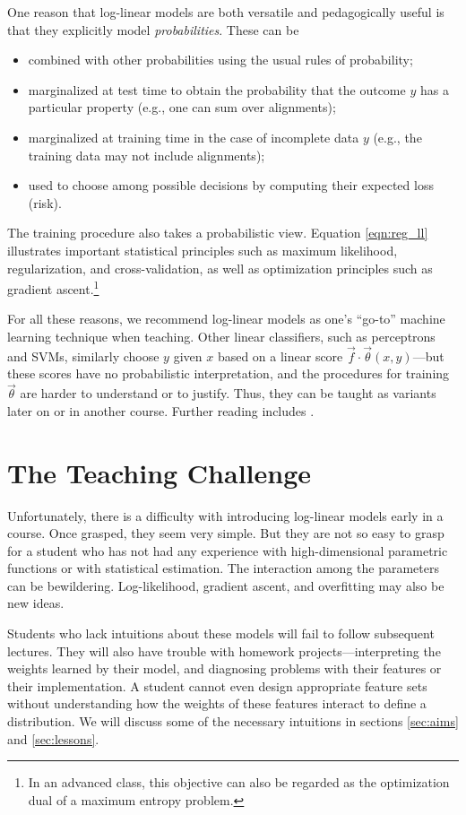 \documentclass[11pt,letterpaper]{article}
\begin{document}
One reason that log-linear models are both versatile and pedagogically
useful is that they explicitly model {\em probabilities}.  These can be 
\begin{itemize}
\item combined with other probabilities using the usual rules of probability;
\item marginalized at test time to obtain the probability that the outcome 
  $y$ has a particular property (e.g., one can sum over alignments);
\item marginalized at training time in the case of incomplete data $y$
  (e.g., the training data may not include alignments);
\item used to choose among possible decisions by computing their 
  expected loss (risk).
\end{itemize}
The training procedure also takes a probabilistic view.  Equation
\eqref{eqn:reg_ll} illustrates important statistical principles such as maximum
likelihood, regularization, and cross-validation, as well as
optimization principles such as gradient ascent.\footnote{In an
  advanced class, this objective can also be regarded as the
  optimization dual of a maximum entropy problem.}

For all these reasons, we recommend log-linear models as one's
``go-to'' machine learning technique when teaching.  Other linear
classifiers, such as perceptrons and SVMs, similarly choose $y$ given
$x$ based on a linear score $\vec{f} \cdot \vec{\theta}(x,y)$---but
these scores have no probabilistic interpretation, and the procedures
for training $\vec{\theta}$ are harder to understand or to justify.
Thus, they can be taught as variants later on or in another course.
Further reading includes \cite{smith-2011}.

\section{The Teaching Challenge} \label{sec:challenges}

Unfortunately, there is a difficulty with introducing log-linear
models early in a course.  Once grasped, they seem very simple.  But
they are not so easy to grasp for a student who has not had any
experience with high-dimensional parametric functions or with
statistical estimation.  The interaction among the parameters can be
bewildering.  Log-likelihood, gradient ascent, and overfitting may also
be new ideas.

Students who lack intuitions about these models will fail to follow
subsequent lectures.  They will also have trouble with homework
projects---interpreting the weights learned by their model, and
diagnosing problems with their features or their implementation.  A
student cannot even design appropriate feature sets without
understanding how the weights of these features interact to define a
distribution.  We will discuss some of the necessary intuitions in
sections \ref{sec:aims} and \ref{sec:lessons}.
\end{document}

